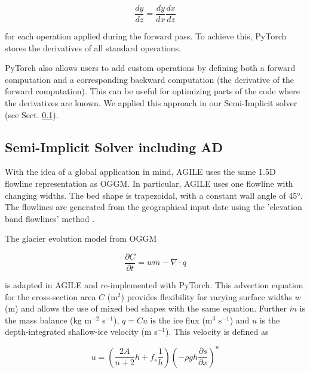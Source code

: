 \documentclass[journal abbreviation, manuscript]{copernicus}
\begin{document}
\begin{equation}
    \frac{dy}{dz} = \frac{dy}{dx}\frac{dx}{dz}
\end{equation}

\noindent for each operation applied during the forward pass. To achieve this, PyTorch stores the derivatives of all standard operations.

PyTorch also allows users to add custom operations by defining both a forward computation and a corresponding backward computation (the derivative of the forward computation). This can be useful for optimizing parts of the code where the derivatives are known. We applied this approach in our Semi-Implicit solver (see Sect. \ref{appendix:semi_impicit}).

\subsection{Semi-Implicit Solver including AD}     %
\label{appendix:semi_impicit}

With the idea of a global application in mind, AGILE uses the same 1.5D flowline representation as OGGM. In particular, AGILE uses one flowline with changing widths. The bed shape is trapezoidal, with a constant wall angle of 45°. The flowlines are generated from the geographical input date using the 'elevation band flowlines' method \citep[e.g.][]{Huss2012, Huss2015, Werder2019}.

The glacier evolution model from OGGM \citep[originally introduced by][]{Oerlemans1997} 

\begin{equation}
\label{eqn:advection_cross_section}
    \frac{\partial C}{\partial t} = w \Dot{m} - \nabla \cdot q
\end{equation}

\noindent is adapted in AGILE and re-implemented with PyTorch. This advection equation for the cross-section area $C$ (m$^2$) provides flexibility for varying surface widths $w$ (m) and allows the use of mixed bed shapes with the same equation. Further $\Dot{m}$ is the mass balance (kg m$^{-2}$ s$^{-1}$), $q = C u$ is the ice flux (m$^3$ s$^{-1}$) and $u$ is the depth-integrated shallow-ice velocity (m s$^{-1}$). This velocity is defined as

\begin{equation} \label{eqn:shallow_ice_velocity}
    u = \left( \frac{2A}{n+2} h + f_s \frac{1}{h} \right)\left(- \rho g h \frac{\partial s}{\partial x} \right)^n
\end{equation}
\end{document}
